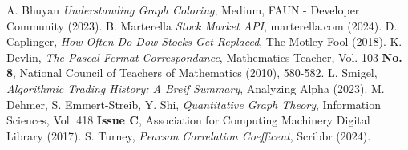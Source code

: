 \documentclass{article}
\begin{document}

\begin{thebibliography}{99}
    A. Bhuyan \emph{Understanding Graph Coloring}, Medium, FAUN - Developer Community (2023).
    B. Marterella \emph{Stock Market API}, marterella.com (2024).
    D. Caplinger, \emph{How Often Do Dow Stocks Get Replaced}, The Motley Fool (2018).
    K. Devlin, \emph{The Pascal-Fermat Correspondance}, Mathematics Teacher, Vol. 103 \textbf{No. 8}, National Council of Teachers of Mathematics (2010), 580-582.
    L. Smigel, \emph{Algorithmic Trading History: A Breif Summary}, Analyzing Alpha (2023).
    M. Dehmer, S. Emmert-Streib, Y. Shi, \emph{Quantitative Graph Theory}, Information Sciences, Vol. 418 \textbf{Issue C}, Association for Computing Machinery Digital Library (2017).
    S. Turney, \emph{Pearson Correlation Coefficent}, Scribbr (2024).
\end{thebibliography}

\clearpage
\end{document}
